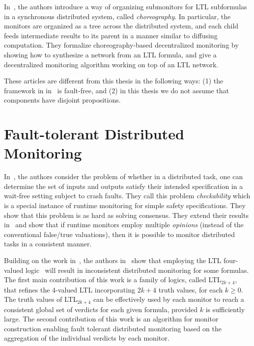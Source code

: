 In~\cite{cf16}, the authors introduce a way of organizing submonitors for 
LTL subformulas in a synchronous distributed system, called {\em 
choreography}. In particular, the monitors are
organized as a tree across 
the distributed system, and each child feeds intermediate results
to its parent 
in a manner similar to diffusing computation. They formalize 
choreography-based decentralized monitoring by showing how
to synthesize a 
network from an LTL formula, and give a decentralized monitoring algorithm
working on top of an LTL network.

These articles are different from this thesis in the following ways: (1) the 
framework in in~\cite{bf16,cf16} is fault-free, and (2) in this thesis we do 
not assume that components have disjoint propositions.

\section{Fault-tolerant Distributed Monitoring}

In~\cite{frt13}, the authors consider the problem of whether in a distributed 
task, one can determine the set of inputs and outputs satisfy their intended 
specification in a wait-free setting subject to crash faults. They call this 
problem {\em checkability} which is a special instance of runtime monitoring for 
simple safety specifications. They show that this problem is as hard as solving 
consensus. They extend their results in~\cite{frt14,frrt14} and show that if 
runtime monitors employ multiple {\em opinions} (instead of the conventional 
false/true valuations), then it is possible to monitor distributed tasks in 
a consistent manner. 

Building on the work in~\cite{frt13,frt14,frrt14}, the authors 
in~\cite{bfrrt16} show that employing the LTL four-valued logic~\cite{bls10} 
will result in inconsistent distributed monitoring for some formulas. The first 
main contribution of this work is a family of logics, called LTL$_{2k+4}$, that 
refines the 4-valued LTL incorporating $2k +4$ truth values, for each $k \geq 
0$. The truth values of LTL$_{2k+4}$ can be effectively used by each monitor to reach a consistent global set of verdicts for each given formula, provided $k$ is sufficiently large. The second contribution of this work is an algorithm for monitor construction enabling fault tolerant distributed monitoring based on the aggregation of the individual verdicts by each monitor.